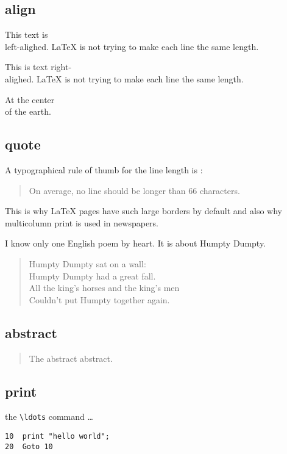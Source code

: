 \documentclass[a4paper, 11pt]{article}
\begin{document}
\subsection{align}
\begin{flushleft}
This text is \\ left-alighed.
\LaTeX{} is not trying to make each line the same length.
\end{flushleft}
\begin{flushright}
This is text right-\\alighed.
\LaTeX{} is not trying to make each line the same length.
\end{flushright}
\begin{center}
At the center \\ of the earth.
\end{center}

\subsection{quote}
A typographical rule of thumb for the line length is :
\begin{quote}
On average, no line should be longer than 66 characters.
\end{quote}
This is why \LaTeX{} pages have such large borders by default and also why multicolumn print is used in newspapers.
\begin{flushleft}
I know only one English poem by heart. It is about Humpty Dumpty.
\begin{verse}
Humpty Dumpty sat on a wall:\\
Humpty Dumpty had a great fall.\\
All the king's horses and the king's men\\
Couldn't put Humpty together again.
\end{verse}
\end{flushleft}

\subsection{abstract}
\begin{abstract}
The abstract abstract.
\end{abstract}

\subsection{print}
the \verb|\ldots| command \ldots 
\begin{verbatim}
10  print "hello world";
20  Goto 10
\end{verbatim}
\end{document}
